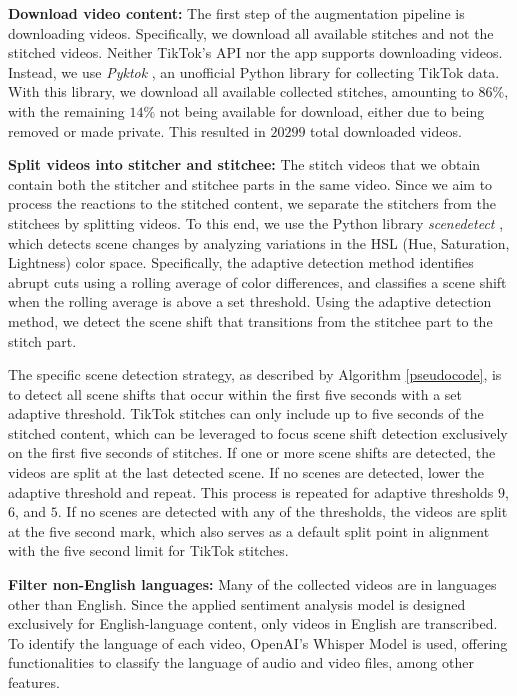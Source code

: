 \textbf{Download video content:} 
The first step of the augmentation pipeline is downloading videos. Specifically, we download all available stitches and not the stitched videos. Neither TikTok's API nor the app supports downloading videos. Instead, we use \textit{Pyktok} \citep{Freelon_pyktok}, an unofficial Python library for collecting TikTok data. With this library, we download all available collected stitches, amounting to $86\%$, with the remaining $14\%$ not being available for download, either due to being removed or made private. This resulted in $20299$ total downloaded videos. 

\textbf{Split videos into stitcher and stitchee:}
The stitch videos that we obtain contain both the stitcher and stitchee parts in the same video. Since we aim to process the reactions to the stitched content, we separate the stitchers from the stitchees by splitting videos. To this end, we use the Python library \textit{scenedetect} \citep{PySceneDetect}, which detects scene changes by analyzing variations in the HSL (Hue, Saturation, Lightness) color space. Specifically, the adaptive detection method identifies abrupt cuts using a rolling average of color differences, and classifies a scene shift when the rolling average is above a set threshold. Using the adaptive detection method, we detect the scene shift that transitions from the stitchee part to the stitch part. 



The specific scene detection strategy, as described by Algorithm \ref{pseudocode}, is to detect all scene shifts that occur within the first five seconds with a set adaptive threshold. TikTok stitches can only include up to five seconds of the stitched content, which can be leveraged to focus scene shift detection exclusively on the first five seconds of stitches. If one or more scene shifts are detected, the videos are split at the last detected scene. If no scenes are detected, lower the adaptive threshold and repeat. This process is repeated for adaptive thresholds $9$, $6$, and $5$. If no scenes are detected with any of the thresholds, the videos are split at the five second mark, which also serves as a default split point in alignment with the five second limit for TikTok stitches. 



\textbf{Filter non-English languages:}
Many of the collected videos are in languages other than English. Since the applied sentiment analysis model is designed exclusively for English-language content, only videos in English are transcribed. To identify the language of each video, OpenAI's Whisper Model \citep{radford2022robustspeechrecognitionlargescale} is used, offering functionalities to classify the language of audio and video files, among other features.

